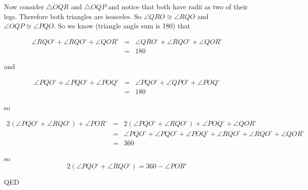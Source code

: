 \documentclass[12pt,letterpaper]{article}
\newcommand{\QED}{\begin{flushright}QED\end{flushright}}
\begin{document}
Now consider $\triangle OQR$ and $\triangle OQP$ and notice that both have radii as two of their legs. Therefore both triangles are isosceles.  So $\angle QRO \cong \angle RQO$ and $\angle OQP \cong \angle PQO$.  So we know (triangle angle sum is 180) that 

\begin{eqnarray*}
\angle RQO^\circ + \angle RQO^\circ + \angle QOR^\circ &=& \angle QRO^\circ + \angle RQO^\circ + \angle QOR^\circ\\
&=& 180
\end{eqnarray*}

and 

\begin{eqnarray*}
\angle PQO^\circ+\angle PQO^\circ+\angle POQ^\circ &=& \angle PQO^\circ+\angle QPO^\circ+\angle POQ^\circ\\
&=& 180
\end{eqnarray*}

so 

\begin{eqnarray*}
2(\angle PQO^\circ+  \angle RQO^\circ ) + \angle POR^\circ
&=& 2(\angle PQO^\circ+  \angle RQO^\circ ) + \angle POQ^\circ  + \angle QOR^\circ\\
&=& \angle PQO^\circ+\angle PQO^\circ+\angle POQ^\circ + \angle RQO^\circ + \angle RQO^\circ + \angle QOR^\circ \\
&=& 360
\end{eqnarray*}

so $$ 2(\angle PQO^\circ+  \angle RQO^\circ ) = 360 - \angle POR^\circ$$


\QED
\end{document}
